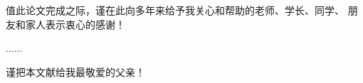 
\begin{thanks}

值此论文完成之际，谨在此向多年来给予我关心和帮助的老师、学长、同学、
朋友和家人表示衷心的感谢！

{\todo}

......

\vskip 18pt

谨把本文献给我最敬爱的父亲！

\end{thanks}

